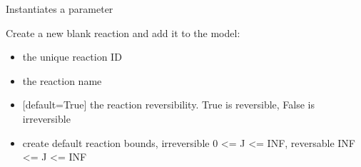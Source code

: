 \documentclass[letterpaper,10pt,english]{sphinxmanual}
\begin{document}
\begin{fulllineitems}
\begin{fulllineitems}
\end{fulllineitems}


\begin{fulllineitems}
\label{\detokenize{modules_doc:cbmpy.CBModel.Model.createParameter}}
\pysigstartsignatures
{}
\pysigstopsignatures
\sphinxAtStartPar
Instantiates a parameter

\end{fulllineitems}


\begin{fulllineitems}
\label{\detokenize{modules_doc:cbmpy.CBModel.Model.createReaction}}
\pysigstartsignatures
{}
\pysigstopsignatures
\sphinxAtStartPar
Create a new blank reaction and add it to the model:
\begin{itemize}
\item {} 
\sphinxAtStartPar
{} the unique reaction ID

\item {} 
\sphinxAtStartPar
{} the reaction name

\item {} 
\sphinxAtStartPar
{} {[}default=True{]} the reaction reversibility. True is reversible, False is irreversible

\item {} 
\sphinxAtStartPar
{} create default reaction bounds, irreversible 0 \textless{}= J \textless{}= INF, reversable \sphinxhyphen{}INF \textless{}= J \textless{}= INF


\end{itemize}
\end{fulllineitems}
\end{fulllineitems}
\end{document}
